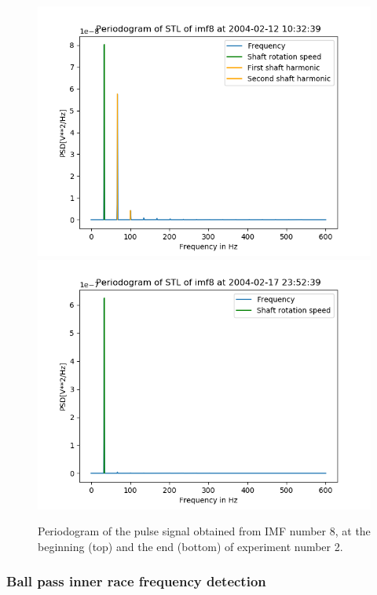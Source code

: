 \documentclass[../Main/thesis.tex]{subfiles}
\begin{document}
 \begin{figure}[H]
	\centering
	\includegraphics[width=0.8\linewidth]{../fig/periodogram_bpfo/start_imf8_shaft}
	\includegraphics[width=0.8\linewidth]{../fig/periodogram_bpfo/end_imf8_shaft}
	\caption{Periodogram of the pulse signal obtained from IMF number 8, at the beginning (top) and the end (bottom) of experiment number 2.}
	\label{fig:startimf8shaft}
\end{figure}
\justify
\subsubsection{ Ball pass inner race frequency detection }
\end{document}
